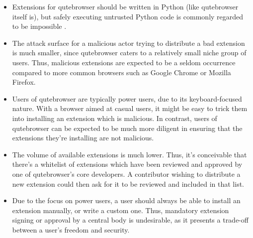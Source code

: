 \documentclass[a4paper,parskip=full,DIV=14,BCOR=15mm]{scrreprt}
\begin{document}
\begin{itemize}
  \item Extensions for qutebrowser should be written in Python (like qutebrowser itself
    is), but safely executing untrusted Python code is commonly regarded to be
    impossible \autocite{nedbat-eval, lwn-pysandbox}.
  \item The attack surface for a malicious actor trying to distribute a bad
    extension is much smaller, since qutebrowser caters to a relatively small
    niche group of users. Thus, malicious extensions are expected to be a seldom
    occurrence compared to more common browsers such as Google Chrome or Mozilla
    Firefox.
  \item Users of qutebrowser are typically power users, due to its
    keyboard-focused nature. With a browser aimed at casual users, it might be
    easy to trick them into installing an extension which is malicious. In
    contrast, users of qutebrowser can be expected to be much more diligent in ensuring that
    the extensions they're installing are not malicious.
  \item The volume of available extensions is much lower. Thus, it's conceivable
    that there's a whitelist of extensions which have been reviewed and approved
    by one of qutebrowser's core developers. A contributor wishing to distribute
    a new extension could then ask for it to be reviewed and included in that list.
  \item Due to the focus on power users, a user should always be able to
    install an extension manually, or write a custom one. Thus, mandatory
    extension signing or approval by a central body is undesirable, as it
    presents a trade-off between a user's freedom and security.
\end{itemize}

% 
% 
% 
% 
\end{document}
